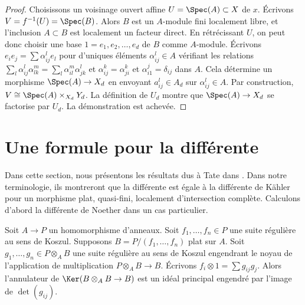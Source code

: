 \begin{proof}
Choisissons un voisinage ouvert affine $U = \Spec(A) \subset X$ de $x$.
Écrivons $V = f^{-1}(U) = \Spec(B)$. Alors $B$ est un
$A$-module fini localement libre, et l'inclusion $A \subset B$ est localement un facteur direct.
En rétrécissant $U$, on peut donc choisir une base $1 = e_1, e_2, \ldots, e_d$
de $B$ comme $A$-module. Écrivons
$e_i e_j = \sum \alpha_{ij}^l e_l$ pour d'uniques
éléments $\alpha_{ij}^l \in A$ vérifiant les relations
$\sum_l \alpha_{ij}^l \alpha_{lk}^m = \sum_l \alpha_{il}^m \alpha _{jk}^l$
et $\alpha_{ij}^k = \alpha_{ji}^k$ et $\alpha_{i1}^j = \delta_{ij}$
dans $A$. Cela détermine un morphisme $\Spec(A) \to X_d$ en envoyant
$a_{ij}^l \in A_d$ sur $\alpha_{ij}^l \in A$. Par construction,
$V \cong \Spec(A) \times_{X_d} Y_d$. La définition de $U_d$
montre que $\Spec(A) \to X_d$ se factorise par $U_d$.
La démonstration est achevée.
\end{proof}










\section{Une formule pour la différente}
\label{section-formula-different}

\noindent
Dans cette section, nous présentons les résultats dus à Tate dans \cite[Appendix A]{Mazur-Roberts}.
Dans notre terminologie, ils montreront que la différente est
égale à la différente de Kähler pour un morphisme plat, quasi-fini,
localement d'intersection complète.
Calculons d'abord la différente de Noether dans un cas particulier.

\begin{lemma}
\label{lemma-tate}
\begin{reference}
\cite[Appendix]{Mazur-Roberts}
\end{reference}
Soit $A \to P$ un homomorphisme d'anneaux. Soit $f_1, \ldots, f_n \in P$ une
suite régulière au sens de Koszul. Supposons $B = P/(f_1, \ldots, f_n)$
plat sur $A$. Soit $g_1, \ldots, g_n \in P \otimes_A B$
une suite régulière au sens de Koszul engendrant le noyau de l'application de multiplication
$P \otimes_A B \to B$. Écrivons $f_i \otimes 1 = \sum g_{ij} g_j$.
Alors l'annulateur de $\Ker(B \otimes_A B \to B)$ est un idéal principal
engendré par l'image de $\det(g_{ij})$.
\end{lemma}

